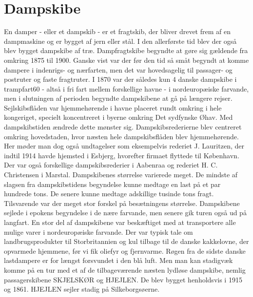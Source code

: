 \part{Dampskibe}\label{part:dampskibe}

En damper - eller et dampskib - er et fragtskib, der bliver drevet frem
af en dampmaskine og er bygget af jern eller stål. I den allerførste tid
blev der også blev bygget dampskibe af træ. Dampfragtskibe begyndte at
gøre sig gældende fra omkring 1875 til 1900. Ganske vist var der før den
tid så småt begyndt at komme dampere i indenrigs- og nærfarten, men det
var hovedsagelig til passager- og postruter og faste fragtruter. I 1870
var der således kun 4 danske dampskibe i trampfart60 - altså i fri fart
mellem forskellige havne - i nordeuropæiske farvande, men i slutningen
af perioden begyndte dampskibene at gå på længere rejser.
Sejlskibsflåden var hjemmehørende i havne placeret rundt omkring i hele
kongeriget, specielt koncentreret i byerne omkring Det sydfynske Øhav.
Med dampskibstiden ændrede dette mønster sig. Dampskibsrederierne blev
centreret omkring hovedstaden, hvor næsten hele dampskibsflåden blev
hjemmehørende. Her møder man dog også undtagelser som eksempelvis
rederiet J. Lauritzen, der indtil 1914 havde hjemsted i Esbjerg,
hvorefter firmaet flyttede til København. Der var også forskellige
dampskibsrederier i Aabenraa og rederiet H. C. Christensen i Marstal.
Dampskibenes størrelse varierede meget. De mindste af slagsen fra
dampskibstidens begyndelse kunne medtage en last på et par hundrede
tons. De senere kunne medtage adskillige tusinde tons fragt. Tilsvarende
var der meget stor forskel på besætningens størrelse. Dampskibene
sejlede i epokens begyndelse i de nære farvande, men senere gik turen
også ud på langfart. En stor del af dampskibene var beskæftiget med at
transportere alle mulige varer i nordeuropæiske farvande. Der var typisk
tale om landbrugsprodukter til Storbritannien og kul tilbage til de
danske kakkelovne, der opvarmede hjemmene, før vi fik oliefyr og
fjernvarme. Røgen fra de sidste danske lastdampere er for længst
forsvundet i den blå luft. Men man kan stadigvæk komme på en tur med et
af de tilbageværende næsten lydløse dampskibe, nemlig passagerskibene
SKJELSKØR og HJEJLEN. De blev bygget henholdsvis i 1915 og 1861. HJEJLEN
sejler stadig på Silkeborgsøerne.
